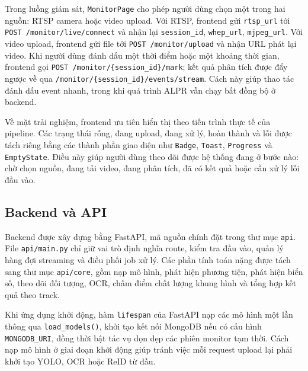 \documentclass[../DoAn.tex]{subfiles}
\begin{document}
Trong luồng giám sát, \texttt{MonitorPage} cho phép người dùng chọn một trong hai nguồn: RTSP camera hoặc video upload. Với RTSP, frontend gửi \texttt{rtsp\_url} tới \texttt{POST /monitor/live/connect} và nhận lại \texttt{session\_id}, \texttt{whep\_url}, \texttt{mjpeg\_url}. Với video upload, frontend gửi file tới \texttt{POST /monitor/upload} và nhận URL phát lại video. Khi người dùng đánh dấu một thời điểm hoặc một khoảng thời gian, frontend gọi \texttt{POST /monitor/\{session\_id\}/mark}; kết quả phân tích được đẩy ngược về qua \texttt{/monitor/\{session\_id\}/events/stream}. Cách này giúp thao tác đánh dấu event nhanh, trong khi quá trình ALPR vẫn chạy bất đồng bộ ở backend.

Về mặt trải nghiệm, frontend ưu tiên hiển thị theo tiến trình thực tế của pipeline. Các trạng thái rỗng, đang upload, đang xử lý, hoàn thành và lỗi được tách riêng bằng các thành phần giao diện như \texttt{Badge}, \texttt{Toast}, \texttt{Progress} và \texttt{EmptyState}. Điều này giúp người dùng theo dõi được hệ thống đang ở bước nào: chờ chọn nguồn, đang tải video, đang phân tích, đã có kết quả hoặc cần xử lý lỗi đầu vào.

\subsection{Backend và API}

Backend được xây dựng bằng FastAPI, mã nguồn chính đặt trong thư mục \texttt{api}. File \texttt{api/main.py} chỉ giữ vai trò định nghĩa route, kiểm tra đầu vào, quản lý hàng đợi streaming và điều phối job xử lý. Các phần tính toán nặng được tách sang thư mục \texttt{api/core}, gồm nạp mô hình, phát hiện phương tiện, phát hiện biển số, theo dõi đối tượng, OCR, chấm điểm chất lượng khung hình và tổng hợp kết quả theo track.

Khi ứng dụng khởi động, hàm \texttt{lifespan} của FastAPI nạp các mô hình một lần thông qua \texttt{load\_models()}, khởi tạo kết nối MongoDB nếu có cấu hình \texttt{MONGODB\_URI}, đồng thời bật tác vụ dọn dẹp các phiên monitor tạm thời. Cách nạp mô hình ở giai đoạn khởi động giúp tránh việc mỗi request upload lại phải khởi tạo YOLO, OCR hoặc ReID từ đầu.
\end{document}
